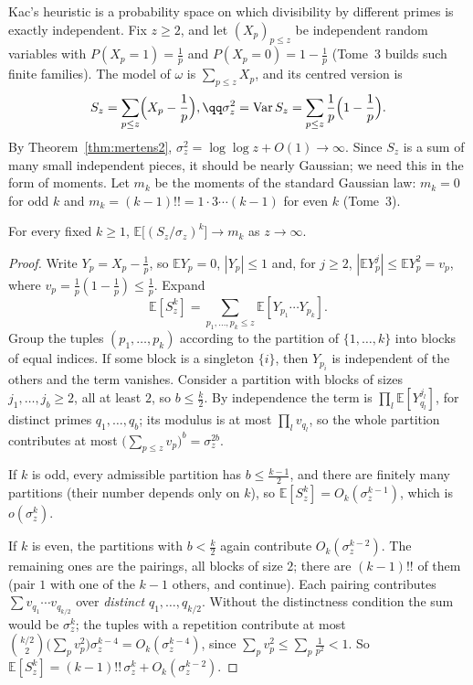 Kac's heuristic is a probability space on which divisibility by different primes is exactly independent. Fix $z\ge2$, and let $(X_p)_{p\le z}$ be independent random variables with
$P(X_p=1)=\frac1p$ and $P(X_p=0)=1-\frac1p$ (Tome~3 builds such finite families). The model of $\omega$ is $\sum_{p\le z}X_p$, and its centred version is
\[
\begin{gathered}S_z=\sum_{p\le z}\Bigl(X_p-\frac1p\Bigr),\qq\sigma_z^2=\operatorname{Var}S_z=\sum_{p\le z}\frac1p\Bigl(1-\frac1p\Bigr).\end{gathered}
\]
By Theorem~\ref{thm:mertens2}, $\sigma_z^2=\log\log z+O(1)\to\infty$. Since $S_z$ is a sum of many small independent pieces, it should be nearly Gaussian; we need this in the form of moments.
Let $m_k$ be the moments of the standard Gaussian law: $m_k=0$ for odd $k$ and $m_k=(k-1)!!=1\cdot3\cdots(k-1)$ for even $k$ (Tome~3).

\begin{lemma}\label{lem:modelmoments}
For every fixed $k\ge1$, $\mathbb E\bigl[(S_z/\sigma_z)^k\bigr]\to m_k$ as $z\to\infty$.
\end{lemma}
\begin{proof}
Write $Y_p=X_p-\frac1p$, so $\mathbb E Y_p=0$, $|Y_p|\le1$ and, for $j\ge2$, $|\mathbb E Y_p^j|\le\mathbb E Y_p^2=v_p$, where $v_p=\frac1p(1-\frac1p)\le\frac1p$. Expand
\[
\mathbb E[S_z^k]=\sum_{p_1,\dots,p_k\le z}\mathbb E[Y_{p_1}\cdots Y_{p_k}].
\]
Group the tuples $(p_1,\dots,p_k)$ according to the partition of $\{1,\dots,k\}$ into blocks of equal indices. If some block is a singleton $\{i\}$, then $Y_{p_i}$ is independent of the others and the term
vanishes. Consider a partition with blocks of sizes $j_1,\dots,j_b\ge2$, all at least $2$, so $b\le\frac k2$. By independence the term is $\prod_l\mathbb E[Y_{q_l}^{j_l}]$, for distinct primes $q_1,\dots,q_b$; its modulus is at
most $\prod_lv_{q_l}$, so the whole partition contributes at most $\bigl(\sum_{p\le z}v_p\bigr)^b=\sigma_z^{2b}$.

If $k$ is odd, every admissible partition has $b\le\frac{k-1}2$, and there are finitely many partitions (their number depends only on $k$), so $\mathbb E[S_z^k]=O_k(\sigma_z^{k-1})$, which is $o(\sigma_z^k)$.

If $k$ is even, the partitions with $b<\frac k2$ again contribute $O_k(\sigma_z^{k-2})$. The remaining ones are the pairings, all blocks of size $2$; there are $(k-1)!!$ of them (pair $1$ with one of the $k-1$ others,
and continue). Each pairing contributes $\sum v_{q_1}\cdots v_{q_{k/2}}$ over \emph{distinct} $q_1,\dots,q_{k/2}$. Without the distinctness condition the sum would be $\sigma_z^k$; the tuples with a repetition
contribute at most $\binom{k/2}2\bigl(\sum_pv_p^2\bigr)\sigma_z^{k-4}=O_k(\sigma_z^{k-4})$, since $\sum_pv_p^2\le\sum_p\frac1{p^2}<1$. So $\mathbb E[S_z^k]=(k-1)!!\,\sigma_z^k+O_k(\sigma_z^{k-2})$.
\end{proof}

